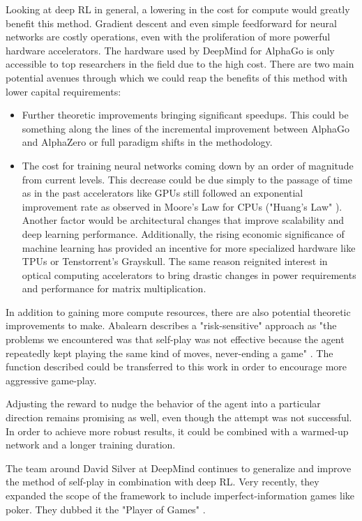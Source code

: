 Looking at deep RL in general, a lowering in the cost for compute would greatly benefit this method. Gradient descent and even simple feedforward for neural networks are costly operations, even with the proliferation of more powerful hardware accelerators. The hardware used by DeepMind for AlphaGo is only accessible to top researchers in the field due to the high cost. There are two main potential avenues through which we could reap the benefits of this method with lower capital requirements:

\begin{itemize}
    \item Further theoretic improvements bringing significant speedups. This could be something along the lines of the incremental improvement between AlphaGo and AlphaZero or full paradigm shifts in the methodology.
    \item The cost for training neural networks coming down by an order of magnitude from current levels. This decrease could be due simply to the passage of time as in the past accelerators like GPUs still followed an exponential improvement rate as observed in Moore's Law for CPUs \cite{moore_cramming_2006} ("Huang's Law" \cite{noauthor_huangs_2021}). Another factor would be architectural changes that improve scalability and deep learning performance. Additionally, the rising economic significance of machine learning has provided an incentive for more specialized hardware like TPUs \cite{noauthor_tpu_nodate} or Tenstorrent's Grayskull. \cite{noauthor_grayskull_nodate} The same reason reignited interest in optical computing accelerators to bring drastic changes in power requirements and performance for matrix multiplication. \cite{noauthor_lightmatter_nodate,noauthor_lightelligence_nodate}
\end{itemize}

In addition to gaining more compute resources, there are also potential theoretic improvements to make. Abalearn describes a "risk-sensitive" approach as "the problems we encountered was that self-play was not effective because the agent repeatedly kept playing the same kind of moves, never-ending a game" \cite[p. 8]{campos_abalearn_2003}. The function described could be transferred to this work in order to encourage more aggressive game-play.

Adjusting the reward to nudge the behavior of the agent into a particular direction remains promising as well, even though the attempt was not successful. In order to achieve more robust results, it could be combined with a warmed-up network and a longer training duration.

The team around David Silver at DeepMind continues to generalize and improve the method of self-play in combination with deep RL. Very recently, they expanded the scope of the framework to include imperfect-information games like poker. They dubbed it the "Player of Games" \cite{schmid_player_2021}.